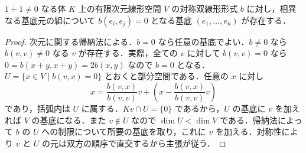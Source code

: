\begin{prop}[対称双線形形式の直交基底]
$1+1\ne0$ なる体 $K$ 上の有限次元線形空間 $V$ の対称双線形形式 $b$ に対し，相異なる基底元の組について $b(e_i,e_j)=0$ となる基底 $(e_1,\ldots,e_n)$ が存在する．
\end{prop}
\begin{proof}
次元に関する帰納法による．$b=0$ なら任意の基底でよい．$b\ne0$ なら $b(v,v)\ne0$ なる $v$ が存在する．実際，全ての $v$ に対して $b(v,v)=0$ なら $0=b(x+y,x+y)=2b(x,y)$ なので $b=0$ となる．$U=\{x\in V\mid b(v,x)=0\}$ とおくと部分空間である．任意の $x$ に対し
\[
 x=\frac{b(v,x)}{b(v,v)}v+
 \left(x-\frac{b(v,x)}{b(v,v)}v\right)
\]
であり，括弧内は $U$ に属する．$Kv\cap U=\{0\}$ であるから，$U$ の基底に $v$ を加えれば $V$ の基底になる．また $v\notin U$ なので $\dim U<\dim V$ である．帰納法によって $b$ の $U$ への制限について所要の基底を取り，これに $v$ を加える．対称性により $v$ と $U$ の元は双方の順序で直交するから主張が従う．
\end{proof}
